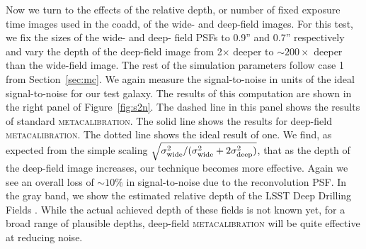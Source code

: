 \documentclass[twocolumn]{openjournal}
\makeatletter
\newcommand{\mcal}{\textsc{metacalibration}\@\xspace}
\makeatother
\begin{document}
Now we turn to the effects of the relative depth, or number of fixed exposure
time images used in the coadd, of the wide- and deep-field images. For
this test, we fix the sizes of the wide- and deep- field PSFs to 0.9'' and 0.7''
respectively and vary the depth of the deep-field image from 2$\times$ deeper to
$\sim200\times$ deeper than the wide-field image. The rest of the simulation
parameters follow case 1 from Section~\ref{sec:mc}. We again measure the
signal-to-noise in units of the ideal signal-to-noise for our test galaxy. The results
of this computation are shown in the right panel of Figure~\ref{fig:s2n}. The dashed
line in this panel shows the results of standard \mcal. The solid line shows the results
for deep-field \mcal. The dotted line shows the ideal result of one. We find, as
expected from the simple scaling
$\sqrt{\sigma^2_{\rm wide}/(\sigma^2_{\rm wide} + 2\sigma^2_{\rm deep})}$,
that as the depth of the deep-field image increases, our
technique becomes more effective. Again we see an overall loss of $\sim10\%$ in
signal-to-noise due to the reconvolution PSF. In the gray band, we show the estimated
relative depth of the LSST Deep Drilling Fields \citep[DDF,][]{lsst-ddf-depth}. While
the actual achieved depth of these fields is not known yet, for a broad range of
plausible depths, deep-field \mcal will be quite effective at reducing noise.
\end{document}
